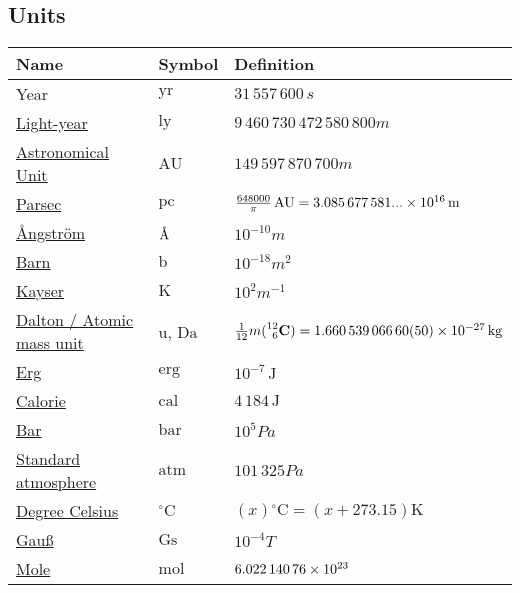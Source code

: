 	\subsection{Units}
		\begin{center}
			\begin{tabular}{| L{.35\textwidth} L{.15\textwidth} L{.4\textwidth} |}
				\hline
				Name & Symbol & Definition \\ \hline \hline
				Year & $\mathrm{yr}$ & $31\,557\,600\,\unit{s}$ \\ \hline
				\href{https://en.wikipedia.org/wiki/Light-year}{Light-year} & $\mathrm{ly}$ & $9\,460\,730\,472\,580\,800\unit{m}$ \\ \hline
				\href{https://en.wikipedia.org/wiki/Astronomical_unit}{Astronomical Unit} & $\mathrm{AU}$ & $149\,597\,870\,700\unit{m}$ \\ \hline
				\href{https://en.wikipedia.org/wiki/Parsec}{Parsec} & $\mathrm{pc}$ & $\frac{648000}{\pi}\,\mathrm{AU} = 3.085\,677\,581...\times 10^{16}\,\mathrm{m}$ \\ \hline
				\href{https://en.wikipedia.org/wiki/Angstrom}{\r{A}ngström} & ${\mbox{\normalfont\AA}}$ & $10^{-10}\unit{m}$ \\ \hline
				\href{https://en.wikipedia.org/wiki/Barn_(unit)}{Barn} & $\mathrm{b}$ & $10^{-18}\unit{m^2}$ \\ \hline
				\href{https://en.wikipedia.org/wiki/Wavenumber#In_spectroscopy}{Kayser} & $\mathrm{K}$ & $10^2\unit{m^{-1}}$ \\ \hline
				\href{https://en.wikipedia.org/wiki/Dalton_(unit)}{Dalton / Atomic mass unit} & $\mathrm{u}$, $\mathrm{Da}$ & $\frac{1}{12}m(\prescript{12}{6}{\mathbf{C}}) = 1.660\,539\,066\,60(50)\times 10^{-27}\,\mathrm{kg}$ \\ \hline
				\href{https://en.wikipedia.org/wiki/Erg}{Erg} & $\mathrm{erg}$ & $10^{-7}\,\mathrm{J}$ \\ \hline
				\href{https://en.wikipedia.org/wiki/Calorie}{Calorie} & $\mathrm{cal}$ & $4\,184\,\mathrm{J}$ \\ \hline
				\href{https://en.wikipedia.org/wiki/Bar_(unit)}{Bar} & $\mathrm{bar}$ & $10^5\unit{Pa}$ \\ \hline
				\href{https://en.wikipedia.org/wiki/Standard_atmosphere_(unit)}{Standard atmosphere} & $\mathrm{atm}$ & $101\,325\unit{Pa}$ \\ \hline
				\href{https://en.wikipedia.org/wiki/Celsius}{Degree Celsius} & $\mathrm{^\circ C}$ & $(x)\mathrm{^\circ C}=(x+273.15)\mathrm{K}$ \\ \hline
				\href{https://en.wikipedia.org/wiki/Gauss_(unit)}{Gauß} & $\mathrm{Gs}$ & $10^{-4}\unit{T}$ \\ \hline
				\href{https://en.wikipedia.org/wiki/Mole_(unit)}{Mole} & $\mathrm{mol}$ & $6.022\,140\,76\times 10^{23}$ \\ \hline
			\end{tabular}
		\end{center}

